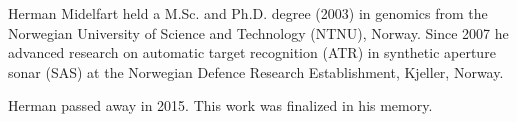 
\begin{IEEEbiography}{Herman Midelfart}
held a M.Sc. and Ph.D. degree (2003) in genomics from the Norwegian University of Science and Technology (NTNU), Norway. Since 2007 he advanced research on automatic target recognition (ATR) in synthetic aperture sonar (SAS) at the Norwegian Defence Research Establishment, Kjeller, Norway.

Herman passed away in 2015. This work was finalized in his memory.
\end{IEEEbiography}
